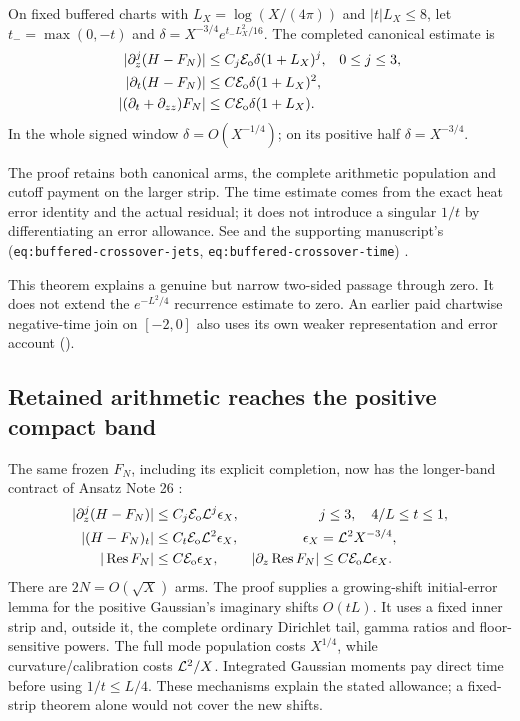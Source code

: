 \begin{theorem}
\label{thm:crossover}
On fixed buffered charts with $L_X=\log(X/(4\pi))$ and
$|t|L_X\le8$, let $t_-=\max(0,-t)$ and
$\delta=X^{-3/4}e^{t_-L_X^2/16}$. The completed canonical estimate is
\begin{align}
 |\partial_z^j(H-F_N)|&\le C_j\mathcal E_{\mathrm o}\delta(1+L_X)^j,
                         &&0\le j\le3,\\
 |\partial_t(H-F_N)|&\le C\mathcal E_{\mathrm o}\delta(1+L_X)^2,\\
 |(\partial_t+\partial_{zz})F_N|&\le C\mathcal E_{\mathrm o}\delta(1+L_X).
 \label{eq:crossover-errors}
\end{align}
In the whole signed window $\delta=O(X^{-1/4})$; on its positive
half $\delta=X^{-3/4}$.
\end{theorem}
The proof retains both canonical arms, the complete arithmetic
population and cutoff payment on the larger strip. The time estimate
comes from the exact heat error identity and the actual residual; it
does not introduce a singular $1/t$ by differentiating an error
allowance. See 
and the supporting manuscript's
(\texttt{eq:buffered-crossover-jets}, \texttt{eq:buffered-crossover-time})
\cite{ansatz}.

This theorem explains a genuine but narrow two-sided passage through
zero. It does not extend the $e^{-L^2/4}$ recurrence estimate to zero.
An earlier paid chartwise negative-time join on $[-2,0]$ also uses
its own weaker representation and error account
().

\subsection{Retained arithmetic reaches the positive compact band}
The same frozen $F_N$, including its explicit completion, now has the
longer-band contract of Ansatz Note 26 \cite{retained}:
\begin{align}
 |\partial_z^j(H-F_N)|&\le C_j\mathcal E_{\mathrm o}\mathcal L^j\epsilon_X,
       &&j\le3,\quad 4/L\le t\le1,\notag\\
 |(H-F_N)_t|&\le C_t\mathcal E_{\mathrm o}\mathcal L^2\epsilon_X,
       &\epsilon_X&=\mathcal L^2X^{-3/4},\label{eq:retained-band}\\
 |\operatorname{Res} F_N|&\le C\mathcal E_{\mathrm o}\epsilon_X,
 &|\partial_z\operatorname{Res} F_N|&\le C\mathcal E_{\mathrm o}\mathcal L\epsilon_X.\notag
\end{align}
There are $2N=O(\sqrt X)$ arms. The proof supplies a growing-shift
initial-error lemma for the positive Gaussian's imaginary shifts
$O(tL)$. It uses a fixed inner strip and, outside it, the complete
ordinary Dirichlet tail, gamma ratios and floor-sensitive powers.
The full mode population costs $X^{1/4}$, while curvature/calibration
costs $\mathcal L^2/X$. Integrated Gaussian moments pay direct time before
using $1/t\le L/4$. These mechanisms explain the stated allowance;
a fixed-strip theorem alone would not cover the new shifts.

